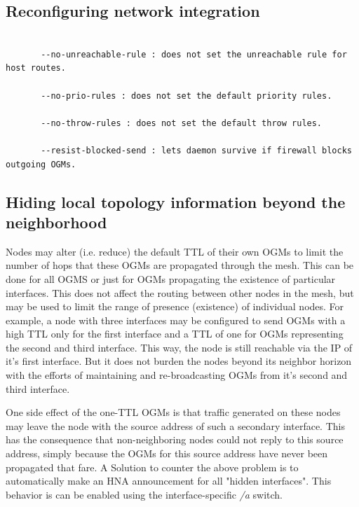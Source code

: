 \documentclass[11pt]{article}
\begin{document}
\subsection{Reconfiguring network integration}

\begin{small} \begin{verbatim}

       --no-unreachable-rule : does not set the unreachable rule for host routes.

       --no-prio-rules : does not set the default priority rules.

       --no-throw-rules : does not set the default throw rules.

       --resist-blocked-send : lets daemon survive if firewall blocks outgoing OGMs.

\end{verbatim} \end{small}

\subsection{Hiding local topology information beyond the neighborhood}

Nodes may alter (i.e. reduce) the default TTL of their own OGMs to limit the number of hops that these OGMs are propagated through the mesh. 
This can be done for all OGMS or just for OGMs propagating the existence of particular interfaces. 
This does not affect the routing between other nodes in the mesh, but may be used to limit the range of presence (existence) of individual nodes. 
For example, a node with three interfaces may be configured to send OGMs with a high TTL only for the first interface and a TTL of one for OGMs representing the second and third interface. 
%
This way, the node is still reachable via the IP of it's first interface. 
But it does not burden the nodes beyond its neighbor horizon with the efforts of maintaining and re-broadcasting OGMs from it's second and third interface.

One side effect of the one-TTL OGMs is that traffic generated on these nodes may leave the node with the source address
of such a secondary interface. 
%
This has the consequence that non-neighboring nodes could not reply to this source address, simply because the OGMs for this source address have never been propagated that fare.
A Solution to counter the above problem is to automatically make an HNA announcement for all "hidden interfaces". 
This behavior is can be enabled using the interface-specific \emph{/a} switch. 
\end{document}
